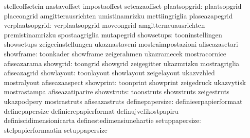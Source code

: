                                   stelleoffsetein                  nastavoffset
                                  impostaoffest                    seteazaoffset
                    plaatsopgrid: plaatsopgrid                     placeongrid
                                  amgitterausrichten               umistinamrizku
                                  mettiingriglia                   plaseazapegrid
                 verplaatsopgrid: verplaatsopgrid                  moveongrid
                                  amgitterneuausrichten            premistinamrizku
                                  spostaagriglia                   mutapegrid
                      showsetups: tooninstellingen                 showsetups
                                  zeigeeinstellungen               ukaznastaveni
                                  mostraimpostazioni               afiseazasetari
                       showframe: toonkader                        showframe
                                  zeigerahmen                      ukazramecek
                                  mostracornice                    afiseazarama
                        showgrid: toongrid                         showgrid
                                  zeigegitter                      ukazmrizku
                                  mostragriglia                    afiseazagrid
                      showlayout: toonlayout                       showlayout
                                  zeigelayout                      ukazvzhled
                                  mostralyout                      afiseazaaspect
                       showprint: toonprint                        showprint
                                  zeigedruck                       ukazvytisk
                                  mostrastampa                     afiseazatiparire
                      showstruts: toonstruts                       showstruts
                                  zeigestruts                      ukazpodpery
                                  mostrastruts                     afiseazastruts
                 definepapersize: definieerpapierformaat           definepapersize
                                  definierepapierformat            definujvelikostpapiru
                                  definiscidimensionicarta         definestedimensiunehartie
                  setuppapersize: stelpapierformaatin              setuppapersize
